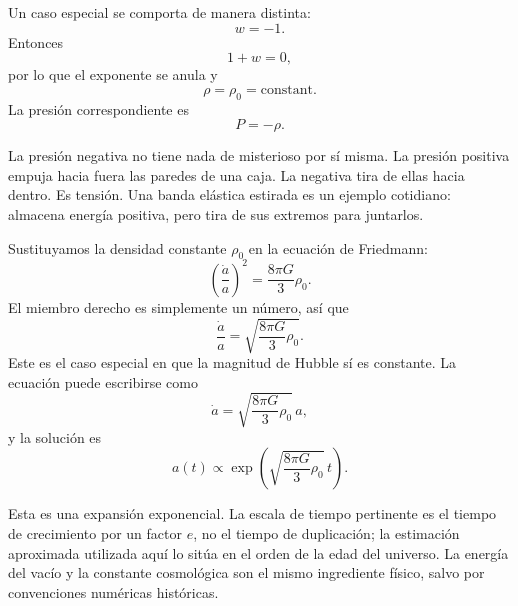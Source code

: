 Un caso especial se comporta de manera distinta:
\begin{equation}
w=-1.
\end{equation}
Entonces
\begin{equation}
1+w=0,
\end{equation}
por lo que el exponente se anula y
\begin{equation}
\rho=\rho_0=\text{constant}.
\end{equation}
La presión correspondiente es
\begin{equation}
P=-\rho .
\end{equation}

La presión negativa no tiene nada de misterioso por sí misma. La presión positiva empuja hacia fuera las paredes de una caja. La negativa tira de ellas hacia dentro. Es tensión. Una banda elástica estirada es un ejemplo cotidiano: almacena energía positiva, pero tira de sus extremos para juntarlos.

Sustituyamos la densidad constante \(\rho_0\) en la ecuación de Friedmann:
\begin{equation}
\left(\frac{\dot a}{a}\right)^2=\frac{8\pi G}{3}\rho_0.
\end{equation}
El miembro derecho es simplemente un número, así que
\begin{equation}
\frac{\dot a}{a}=\sqrt{\frac{8\pi G}{3}\rho_0}.
\end{equation}
Este es el caso especial en que la magnitud de Hubble sí es constante. La ecuación puede escribirse como
\begin{equation}
\dot a=\sqrt{\frac{8\pi G}{3}\rho_0}\,a,
\end{equation}
y la solución es
\begin{equation}
a(t)\propto \exp\!\left(\sqrt{\frac{8\pi G}{3}\rho_0}\,t\right).
\end{equation}

Esta es una expansión exponencial. La escala de tiempo pertinente es el tiempo de crecimiento por un factor \(e\), no el tiempo de duplicación; la estimación aproximada utilizada aquí lo sitúa en el orden de la edad del universo. La energía del vacío y la constante cosmológica son el mismo ingrediente físico, salvo por convenciones numéricas históricas.

\begin{classroomqa}
\end{classroomqa}

